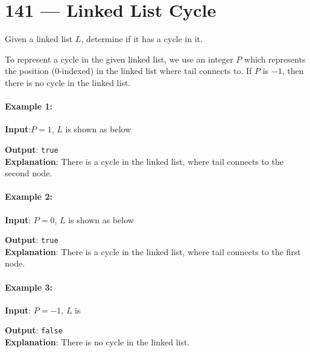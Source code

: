 \section{141 --- Linked List Cycle}
Given a linked list $L$, determine if it has a cycle in it.
\par
To represent a cycle in the given linked list, we use an integer $P$ which represents the position (0-indexed) in the linked list where tail connects to. If $P$ is $-1$, then there is no cycle in the linked list.
\paragraph{Example 1:}
\begin{flushleft}
\textbf{Input}:$P = 1$, $L$ is shown as below
\begin{figure}[H]
\end{figure}
\textbf{Output}: \texttt{true}
\\
\textbf{Explanation}: There is a cycle in the linked list, where tail connects to the second node.
\end{flushleft}
\paragraph{Example 2:}
\begin{flushleft}
\textbf{Input}: $P=0$, $L$ is shown as below
\begin{figure}[H]
\end{figure}
\textbf{Output}: \texttt{true}
\\
\textbf{Explanation}: There is a cycle in the linked list, where tail connects to the first node.
\end{flushleft}
\paragraph{Example 3:}
\begin{flushleft}
\textbf{Input}: $P=-1$, $L$ is
\begin{figure}[H]
\end{figure}
\textbf{Output}: \texttt{false}
\\
\textbf{Explanation}: There is no cycle in the linked list.
\end{flushleft}
